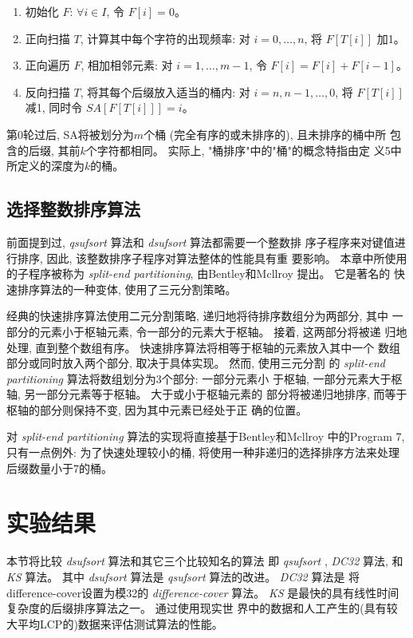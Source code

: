 \begin{enumerate}
\item 初始化 $F$: $\forall i \in I$, 令 $F[i] = 0$。
\item 正向扫描 $T$, 计算其中每个字符的出现频率: 对 $i =
  0,\dots,n$, 将 $F[T[i]]$ 加1。
\item 正向遍历 $F$, 相加相邻元素: 对 $i = 1, \dots, m-1$, 令 $F[i] =
  F[i] + F[i-1]$。
\item 反向扫描 $T$, 将其每个后缀放入适当的桶内: 对 $i = n, n-1,\dots,
  0$, 将 $F[T[i]]$ 减1, 同时令 $SA[F[T[i]]] = i$。
\end{enumerate}

第0轮过后, SA将被划分为$m$个桶 (完全有序的或未排序的), 且未排序的桶中所
包含的后缀, 其前$k$个字符都相同。 实际上, "桶排序"中的"桶"的概念特指由定
义5中所定义的深度为$k$的桶。

\subsection{选择整数排序算法}

前面提到过, \emph{qsufsort} 算法和 \emph{dsufsort} 算法都需要一个整数排
序子程序来对键值进行排序, 因此, 该整数排序子程序对算法整体的性能具有重
要影响。 本章中所使用的子程序被称为 \emph{split-end
  partitioning}, 由Bentley和Mcllroy\cite{Bentley1993} 提出。 它是著名的
快速排序算法\cite{Hoare1962}的一种变体, 使用了三元分割策略。

经典的快速排序算法使用二元分割策略, 递归地将待排序数组分为两部分, 其中
一部分的元素小于枢轴元素, 令一部分的元素大于枢轴。 接着, 这两部分将被递
归地处理, 直到整个数组有序。 快速排序算法将相等于枢轴的元素放入其中一个
数组部分或同时放入两个部分, 取决于具体实现。 然而, 使用三元分割
的 \emph{split-end partitioning} 算法将数组划分为3个部分: 一部分元素小
于枢轴, 一部分元素大于枢轴, 另一部分元素等于枢轴。 大于或小于枢轴元素的
部分将被递归地排序, 而等于枢轴的部分则保持不变, 因为其中元素已经处于正
确的位置。

对 \emph{split-end partitioning} 算法的实现将直接基于Bentley和Mcllroy
\cite{Bentley1993} 中的Program 7, 只有一点例外: 为了快速处理较小的桶,
将使用一种非递归的选择排序方法来处理后缀数量小于7的桶。

\section{实验结果}

本节将比较 \emph{dsufsort} 算法和其它三个比较知名的算法
即 \emph{qsufsort} \cite{Larsson2007},
\emph{DC32}\cite{Burkhardt2003} 算法, 和 \emph{KS} 算法\cite{Karkkainen2006}。 其中
\emph{dsufsort} 算法是 \emph{qsufsort} 算法的改进。 \emph{DC32} 算法是
将 difference-cover设置为模32的 \emph{difference-cover} 算法。
\emph{KS} 是最快的具有线性时间复杂度的后缀排序算法之一。 通过使用现实世
界中的数据和人工产生的(具有较大平均LCP的)数据来评估测试算法的性能。

